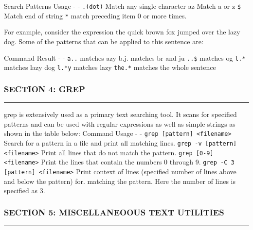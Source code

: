 Search Patterns \textbar{} Usage - \textbar{} - \texttt{.(dot)}
\textbar{} Match any single character a\textbar{}z \textbar{} Match a or
z \texttt{\$} \textbar{} Match end of string \texttt{*} \textbar{} match
preceding item 0 or more times.

For example, consider the expression the quick brown fox jumped over the
lazy dog. Some of the patterns that can be applied to this sentence are:

Command \textbar{} Result - \textbar{} - \texttt{a..} \textbar{} matches
azy b.\textbar{}j. \textbar{} matches br and ju \texttt{..\$} \textbar{}
matches og \texttt{l.*} \textbar{} matches lazy dog \texttt{l.*y}
\textbar{} matches lazy \texttt{the.*} \textbar{} matches the whole
sentence

\subsubsection{SECTION 4: GREP}\label{section-4-grep}

\begin{center}\rule{3in}{0.4pt}\end{center}

grep is extensively used as a primary text searching tool. It scans for
specified patterns and can be used with regular expressions as well as
simple strings as shown in the table below: Command \textbar{} Usage -
\textbar{} -
\texttt{grep {[}pattern{]} \textless{}filename\textgreater{}} \textbar{}
Search for a pattern in a file and print all matching lines.
\texttt{grep -v {[}pattern{]} \textless{}filename\textgreater{}}
\textbar{} Print all lines that do not match the pattern.
\texttt{grep {[}0-9{]} \textless{}filename\textgreater{}} \textbar{}
Print the lines that contain the numbers 0 through 9.
\texttt{grep -C 3 {[}pattern{]} \textless{}filename\textgreater{}}
\textbar{} Print context of lines (specified number of lines above and
below the pattern) for. matching the pattern. Here the number of lines
is specified as 3.

\subsubsection{SECTION 5: MISCELLANEOOUS TEXT
UTILITIES}\label{section-5-miscellaneoous-text-utilities}

\begin{center}\rule{3in}{0.4pt}\end{center}

